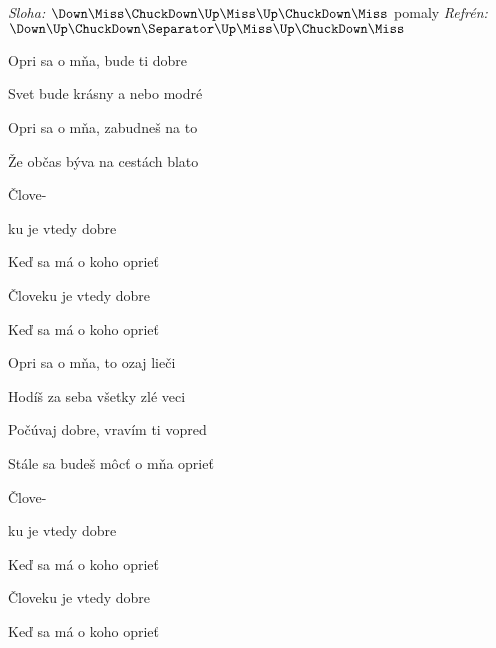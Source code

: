 \begin{song}


\begin{headerbox}
\RaiseBoxWithChucks
\textit{Sloha:} $\Down\Miss\ChuckDown\Up\Miss\Up\ChuckDown\Miss$ pomaly \quad
\textit{Refrén:} $\Down\Up\ChuckDown \Separator \Up\Miss\Up\ChuckDown\Miss$
\end{headerbox}

\begin{hchordbox}
\end{hchordbox}

\Large

\bigskip

 Opri sa o mňa,  bude ti dobre \par
{} Svet bude krásny  a nebo modré \par
{} Opri sa o mňa,  zabudneš na to \par
{} Že občas býva na cestách blato \par

\bigskip

 Člove- \par
{}ku je vtedy dobre   \par
Keď sa má o koho oprieť  \par
Človeku je vtedy dobre   \par
Keď sa má o koho oprieť  \par

\bigskip

 Opri sa o mňa,  to ozaj lieči \par
{} Hodíš za seba všetky zlé veci \par
{} Počúvaj dobre,  vravím ti vopred \par
{} Stále sa budeš môcť o mňa oprieť \par

\bigskip

 Člove- \par
{}ku je vtedy dobre   \par
Keď sa má o koho oprieť  \par
Človeku je vtedy dobre   \par
Keď sa má o koho oprieť  \par


\end{song}
